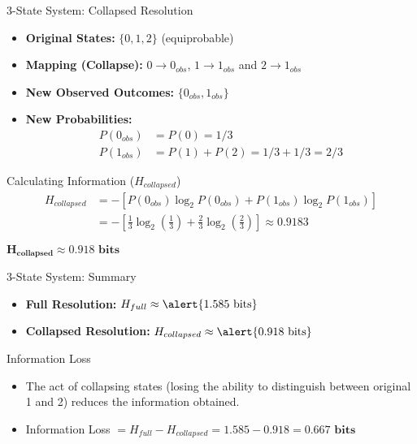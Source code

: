 \documentclass{beamer}
\begin{document}
\begin{frame}{3-State System: Collapsed Resolution}
    \begin{itemize}
        \item \textbf{Original States:} $\{0, 1, 2\}$ (equiprobable)
        \item \textbf{Mapping (Collapse):}
             $0 \rightarrow 0_{obs}$,  $1 \rightarrow 1_{obs}$ and  $2 \rightarrow 1_{obs}$
        \item \textbf{New Observed Outcomes:} $\{0_{obs}, 1_{obs}\}$
        \item \textbf{New Probabilities:}
            \begin{align*}
                P(0_{obs}) &= P(0) = 1/3 \\
                P(1_{obs}) &= P(1) + P(2) = 1/3 + 1/3 = 2/3
            \end{align*}
    \end{itemize}
    \pause
    \begin{block}{Calculating Information ($H_{collapsed}$)}
        \begin{align*}
            H_{collapsed} &= - \left[ P(0_{obs}) \log_2 P(0_{obs}) + P(1_{obs}) \log_2 P(1_{obs}) \right] \\
            &= - \left[ \frac{1}{3} \log_2 \left(\frac{1}{3}\right) + \frac{2}{3} \log_2 \left(\frac{2}{3}\right) \right]
            \approx 0.9183
        \end{align*}
        \begin{center}
            $\boldsymbol{H_{collapsed} \approx 0.918 \text{ bits}}$
        \end{center}
    \end{block}
\end{frame}

\begin{frame}{3-State System: Summary}
    \begin{itemize}
        \item \textbf{Full Resolution:} $H_{full} \approx \alert{1.585 \text{ bits}}$
        \item \textbf{Collapsed Resolution:} $H_{collapsed} \approx \alert{0.918 \text{ bits}}$
    \end{itemize}
    \pause
    \begin{block}{Information Loss}
        \begin{itemize}
            \item The act of collapsing states (losing the ability to distinguish between original 1 and 2) reduces the information obtained.
            \item Information Loss $= H_{full} - H_{collapsed} = 1.585 - 0.918 = \mathbf{0.667 \text{ bits}}$
        \end{itemize}
    \end{block}
\end{frame}
\end{document}
